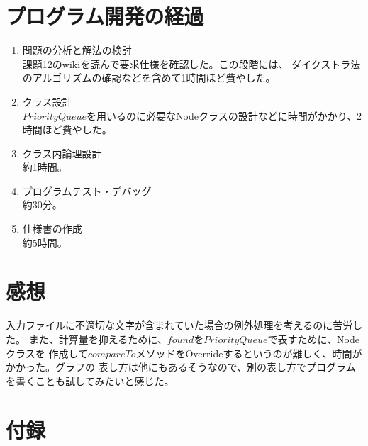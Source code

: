 \documentclass[a4j]{jarticle}
\begin{document}
\section{プログラム開発の経過}

\begin{enumerate}
  \item 問題の分析と解法の検討\\
  課題12のwikiを読んで要求仕様を確認した。この段階には、
  ダイクストラ法のアルゴリズムの確認などを含めて1時間ほど費やした。
  \item クラス設計\\
  \(PriorityQueue\)を用いるのに必要なNodeクラスの設計などに時間がかかり、2時間ほど費やした。
  \item クラス内論理設計\\
  約1時間。
  \item プログラムテスト・デバッグ\\
  約30分。
  \item 仕様書の作成\\
  約5時間。
\end{enumerate}

\section{感想}

入力ファイルに不適切な文字が含まれていた場合の例外処理を考えるのに苦労した。
また、計算量を抑えるために、\(found\)を\(PriorityQueue\)で表すために、Nodeクラスを
作成して\(compareTo\)メソッドをOverrideするというのが難しく、時間がかかった。グラフの
表し方は他にもあるそうなので、別の表し方でプログラムを書くことも試してみたいと感じた。

\newpage
\section*{付録}

\end{document}
